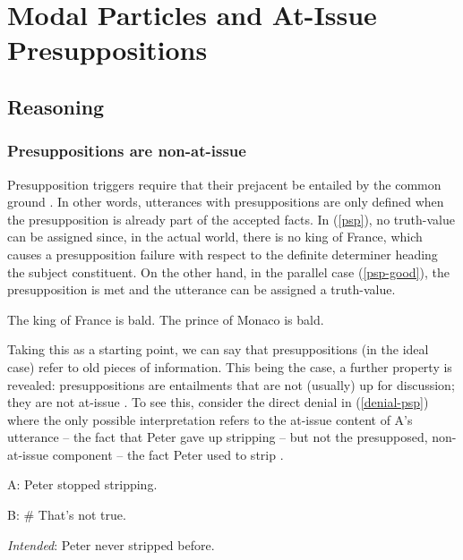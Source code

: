 \chapter{Modal Particles and At-Issue Presuppositions}

\section{Reasoning}

\subsection{Presuppositions are non-at-issue}

Presupposition triggers require that their prejacent be entailed by the common ground \parencite{stalnaker2002common}. In other words,
utterances with presuppositions are only defined when the presupposition is already part of the
accepted facts. In (\ref{psp}), no truth-value can be assigned since, in the actual world, there is no king of
France, which causes a presupposition failure with respect to the definite determiner heading the
subject constituent. On the other hand, in the parallel case (\ref{psp-good}), the presupposition is
met and the utterance can be assigned a truth-value.

\begin{exe}
    \ex \begin{xlist}
        \ex \label{psp}The king of France is bald.
        \ex \label{psp-good} The prince of Monaco is bald.
    \end{xlist}
\end{exe}

Taking this as a starting point, we can say that presuppositions (in the ideal case) refer to old
pieces of information. This being the case, a further property is revealed: presuppositions are
entailments that are not (usually) up for discussion; they are not at-issue
\parencite{aravind2017factivity}. To see this, consider the direct denial in (\ref{denial-psp})
where the only possible interpretation refers to the at-issue content of A's utterance -- the fact
that Peter gave up stripping -- but not the presupposed, non-at-issue component -- the fact Peter
used to strip \parencite[cf.][]{tonhauser2012diagnosing}.

\begin{exe}
    \ex \label{denial-psp}A: Peter stopped stripping.

    B: \# That's not true.

    \textit{Intended}: Peter never stripped before.
\end{exe}

